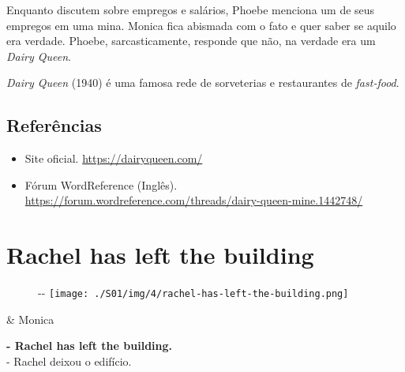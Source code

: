 Enquanto discutem sobre empregos e salários, Phoebe menciona um de seus
empregos em uma mina. Monica fica abismada com o fato e quer saber se
aquilo era verdade. Phoebe, sarcasticamente, responde que não, na
verdade era um \emph{Dairy Queen}.

\emph{Dairy Queen} (1940) é uma famosa rede de sorveterias e
restaurantes de \emph{fast-food}.

\hypertarget{referuxeancias}{%
\subsection{Referências}\label{referuxeancias}}

\begin{itemize}
\tightlist
\item
  \sloppy Site oficial. \url{https://dairyqueen.com/}
\item
  \sloppy Fórum WordReference (Inglês). \url{https://forum.wordreference.com/threads/dairy-queen-mine.1442748/}
\end{itemize}

\hypertarget{rachel-has-left-the-building}{%
\section{Rachel has left the
building}\label{rachel-has-left-the-building}}

\begin{figure}[!ht]
  \begin{adjustwidth}{-\oddsidemargin-1in}{-\rightmargin}
    \centering
    \texttt{[image: ./S01/img/4/rachel-has-left-the-building.png]}
  \end{adjustwidth}
\end{figure}

\begin{tcolorbox}[enhanced,center upper,
    drop fuzzy shadow southeast, boxrule=0.3pt,
    lower separated=false,
    colframe=black!30!dialogoBorder,colback=white]
\begin{minipage}[c]{0.16\linewidth}
   & \centering \scriptsize{Monica}
\end{minipage}
\hfill
\begin{minipage}[c]{0.8\linewidth}
  \textbf{- Rachel has left the building.}\\
  - Rachel deixou o edifício.
\end{minipage}
\end{tcolorbox}

